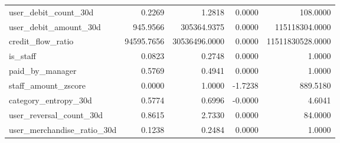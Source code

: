 \begin{table}[htbp]
\begin{tabular}{lrrrr}
  user\_debit\_count\_30d & 0.2269 & 1.2818 & 0.0000 & 108.0000 \\
  user\_debit\_amount\_30d & 945.9566 & 305364.9375 & 0.0000 & 115118304.0000 \\
  credit\_flow\_ratio & 94595.7656 & 30536496.0000 & 0.0000 & 11511830528.0000 \\
  is\_staff & 0.0823 & 0.2748 & 0.0000 & 1.0000 \\
  paid\_by\_manager & 0.5769 & 0.4941 & 0.0000 & 1.0000 \\
  staff\_amount\_zscore & 0.0000 & 1.0000 & -1.7238 & 889.5180 \\
  category\_entropy\_30d & 0.5774 & 0.6996 & -0.0000 & 4.6041 \\
  user\_reversal\_count\_30d & 0.8615 & 2.7330 & 0.0000 & 84.0000 \\
  user\_merchandise\_ratio\_30d & 0.1238 & 0.2484 & 0.0000 & 1.0000 \\
\bottomrule
\end{tabular}
\end{table}
